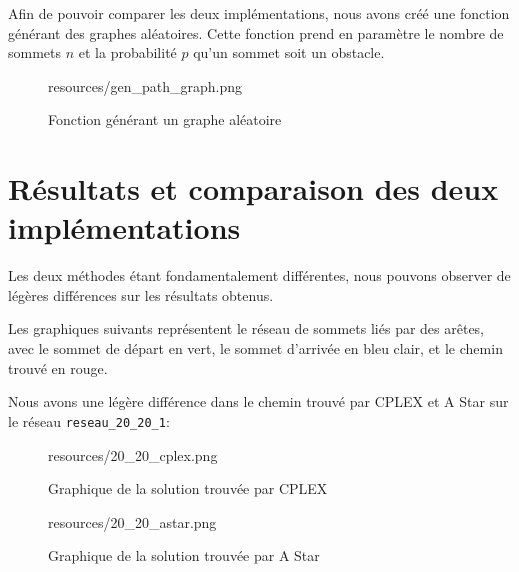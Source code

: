 Afin de pouvoir comparer les deux implémentations, nous avons créé une fonction générant des graphes aléatoires. Cette fonction prend en paramètre le nombre de sommets $n$ et la probabilité $p$ qu'un sommet soit un obstacle.

\begin{figure}[H]
    \centering
    \begin{includegraphics}[width=1\textwidth]{resources/gen_path_graph.png}
    \end{includegraphics}
    \caption{Fonction générant un graphe aléatoire}
    \label{fig:gen_path_graph}
\end{figure}

\section{Résultats et comparaison des deux implémentations}
\label{sec:shortest_path_comparison}

Les deux méthodes étant fondamentalement différentes, nous pouvons observer de légères différences sur les résultats obtenus.

Les graphiques suivants représentent le réseau de sommets liés par des arêtes, avec le sommet de départ en vert, le sommet d'arrivée en bleu clair, et le chemin trouvé en rouge.

Nous avons une légère différence dans le chemin trouvé par CPLEX et A Star sur le réseau \texttt{reseau\_20\_20\_1}:

\begin{figure}[H]
    \centering
    \begin{includegraphics}[width=.6\textwidth]{resources/20_20_cplex.png}
    \end{includegraphics}
    \caption{Graphique de la solution trouvée par CPLEX}
    \label{fig:cplex_2020}
\end{figure}

\begin{figure}[H]
    \centering
    \begin{includegraphics}[width=.6\textwidth]{resources/20_20_astar.png}
    \end{includegraphics}
    \caption{Graphique de la solution trouvée par A Star}
    \label{fig:astar_2020}
\end{figure}